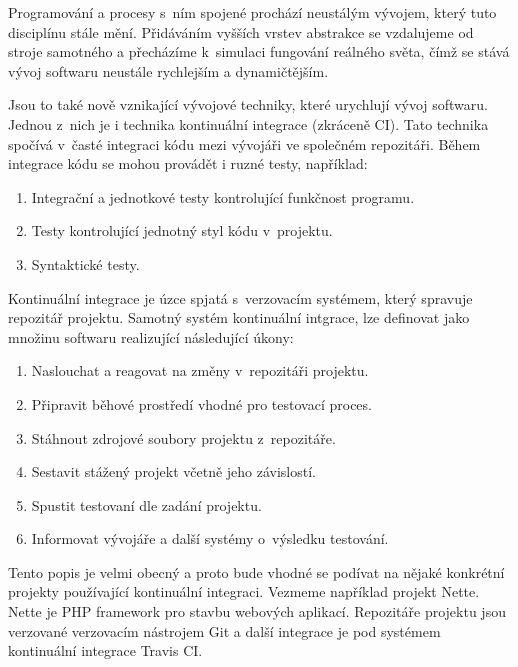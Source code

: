 \begin{introduction}

Programování a procesy s~ním spojené prochází neustálým vývojem, který tuto disciplínu stále mění. 
Přidáváním vyšších vrstev abstrakce se vzdalujeme od stroje samotného a přecházíme k~simulaci fungování reálného světa, čímž se stává vývoj softwaru neustále rychlejším a dynamičtějším. 

Jsou to také nově vznikající vývojové techniky, které urychlují vývoj softwaru.
Jednou z~nich je i technika kontinuální integrace (zkráceně CI).
Tato technika spočívá v~časté integraci kódu mezi vývojáři ve společném repozitáři.
Během integrace kódu se mohou provádět i ruzné testy, například:

\begin{enumerate}
	\item Integrační a jednotkové testy kontrolující funkčnost programu.
	\item Testy kontrolující jednotný styl kódu v~projektu.
	\item Syntaktické testy.
\end{enumerate}

Kontinuální integrace je úzce spjatá s~verzovacím systémem, který spravuje repozitář projektu.
Samotný systém kontinuální intgrace, lze definovat jako množinu softwaru realizující následující úkony:

\begin{enumerate}
	\item Naslouchat a reagovat na změny v~repozitáři projektu.
	\item Připravit běhové prostředí vhodné pro testovací proces.
	\item Stáhnout zdrojové soubory projektu z~repozitáře.
	\item Sestavit stážený projekt včetně jeho závislostí.
	\item Spustit testovaní dle zadání projektu.
	\item Informovat vývojáře a další systémy o~výsledku testování.
\end{enumerate}

\end{introduction}

Tento popis je velmi obecný a proto bude vhodné se podívat na nějaké konkrétní projekty používající kontinuální integraci.
Vezmeme například projekt Nette.
Nette je PHP framework pro stavbu webových aplikací.
Repozitáře projektu jsou verzované verzovacím nástrojem Git a další integrace je pod systémem kontinuální integrace Travis CI.

